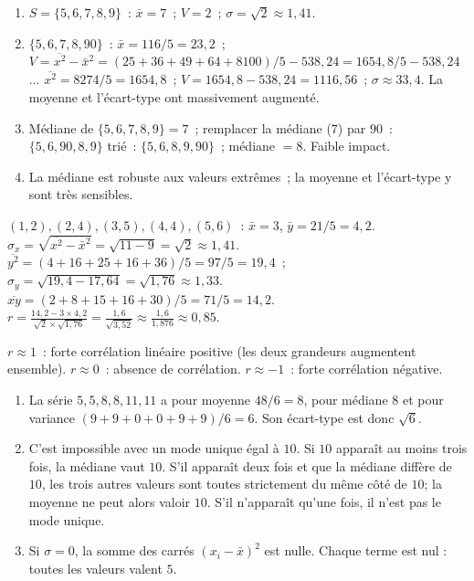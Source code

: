 
\begin{enumerate}
  \item $S=\{5,6,7,8,9\}$~: $\bar{x}=7$~; $V=2$~; $\sigma=\sqrt{2}\approx1{,}41$.
  \item $\{5,6,7,8,90\}$~: $\bar{x}=116/5=23{,}2$~;
        $V=\overline{x^2}-\bar{x}^2=(25+36+49+64+8100)/5-538{,}24=1654{,}8/5-538{,}24$
        ... $\overline{x^2}=8274/5=1654{,}8$~; $V=1654{,}8-538{,}24=1116{,}56$~; $\sigma\approx33{,}4$.
        La moyenne et l'\'ecart-type ont massivement augment\'e.
  \item M\'ediane de $\{5,6,7,8,9\}=7$~; remplacer la m\'ediane ($7$) par $90$~:
        $\{5,6,90,8,9\}$ tri\'e~: $\{5,6,8,9,90\}$~; m\'ediane $=8$. Faible impact.
  \item La m\'ediane est robuste aux valeurs extr\^emes~; la moyenne et l'\'ecart-type y sont tr\`es sensibles.
\end{enumerate}


$(1,2),(2,4),(3,5),(4,4),(5,6)$~: $\bar{x}=3$, $\bar{y}=21/5=4{,}2$.
$\sigma_x=\sqrt{\overline{x^2}-\bar{x}^2}=\sqrt{11-9}=\sqrt{2}\approx1{,}41$.
$\overline{y^2}=(4+16+25+16+36)/5=97/5=19{,}4$~; $\sigma_y=\sqrt{19{,}4-17{,}64}=\sqrt{1{,}76}\approx1{,}33$.
$\overline{xy}=(2+8+15+16+30)/5=71/5=14{,}2$.
$r=\frac{14{,}2-3\times4{,}2}{\sqrt{2}\times\sqrt{1{,}76}}=\frac{1{,}6}{\sqrt{3{,}52}}\approx\frac{1{,}6}{1{,}876}\approx0{,}85$.

$r\approx1$~: forte corr\'elation lin\'eaire positive (les deux grandeurs augmentent ensemble).
$r\approx0$~: absence de corr\'elation. $r\approx-1$~: forte corr\'elation n\'egative.


\begin{enumerate}
  \item La s\'erie $5,5,8,8,11,11$ a pour moyenne $48/6=8$,
        pour m\'ediane $8$ et pour variance $(9+9+0+0+9+9)/6=6$.
        Son \'ecart-type est donc $\sqrt6$.
  \item C'est impossible avec un mode unique \'egal \`a $10$.
        Si $10$ appara\^it au moins trois fois, la m\'ediane vaut $10$.
        S'il appara\^it deux fois et que la m\'ediane diff\`ere de $10$,
        les trois autres valeurs sont toutes strictement du m\^eme c\^ot\'e de $10$;
        la moyenne ne peut alors valoir $10$.
        S'il n'appara\^it qu'une fois, il n'est pas le mode unique.
  \item Si $\sigma=0$, la somme des carr\'es $(x_i-\bar x)^2$ est nulle.
        Chaque terme est nul : toutes les valeurs valent $5$.
\end{enumerate}

